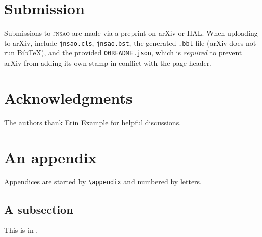 \documentclass[english,review]{jnsao}
\newcommand{\jnsao}{\textsc{jnsao}}
\newcommand{\cs}[1]{\texttt{\textbackslash#1}}
\newcommand{\pkg}[1]{\texttt{#1}}
\begin{document}
\section{Submission}

Submissions to \jnsao{} are made via a preprint on arXiv or HAL. When uploading to arXiv, include \pkg{jnsao.cls}, \pkg{jnsao.bst}, the generated \pkg{.bbl} file (arXiv does not run Bib\TeX), and the provided \pkg{00README.json}, which is \emph{required} to prevent arXiv from adding its own stamp in conflict with the page header.

\section*{Acknowledgments}

The authors thank Erin Example for helpful discussions.

\appendix

\section{An appendix}\label{app}

Appendices are started by \cs{appendix} and numbered by letters.

\subsection{A subsection}\label{app:sec}

This is  in .



\end{document}
